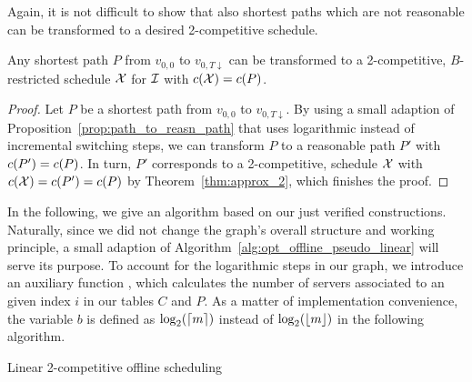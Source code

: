 Again, it is not difficult to show that also shortest paths which are not reasonable can be transformed to a desired 2-competitive schedule.
\begin{cor}
Any shortest path $P$ from $v_{0,0}$ to $v_{0,T\downarrow}$ can be transformed to a 2-competitive, $B$-restricted schedule $\mx$ for $\mathcal{I}$ with $c(\mathcal{X})=c(P)$.
\end{cor}
\begin{proof}
Let $P$ be a shortest path from $v_{0,0}$ to $v_{0,T\downarrow}$. By using a small adaption of Proposition~\ref{prop:path_to_reasn_path} that uses logarithmic instead of incremental switching steps, we can transform $P$ to a reasonable path $P'$ with $c(P')=c(P)$.
In turn, $P'$ corresponds to a 2-competitive,  schedule $\mx$ with $c(\mathcal{X})=c(P')=c(P)$ by Theorem~\ref{thm:approx_2}, which finishes the proof.
\end{proof}
In the following, we give an algorithm based on our just verified constructions. Naturally, since we did not change the graph's overall structure and working principle, a small adaption of Algorithm~\ref{alg:opt_offline_pseudo_linear} will serve its purpose. To account for the logarithmic steps in our graph, we introduce an auxiliary function , which calculates the number of servers associated to an given index $i$ in our tables $C$ and $P$. As a matter of implementation convenience, the variable $b$ is defined as $\log_2(\lceil m\rceil)$ instead of $\log_2(\lfloor m\rfloor)$ in the following algorithm.
\begin{algorithm}[H]
  \caption{Linear 2-competitive offline scheduling}
  \label{alg:approx_2_offline_linear}
  \begin{algorithmic}[1]
	  \State \Return{$\mx$}
  \EndFunction
  \Statex
	  \State {}
  \EndFunction
  \end{algorithmic}
\end{algorithm}
